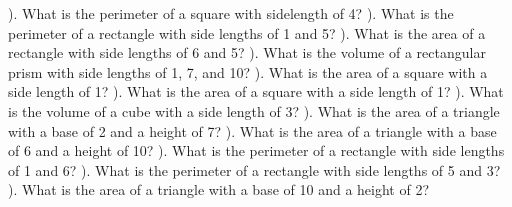 \documentclass{article}%
\begin{document}
\newline%
\newline%
). What is the perimeter of a square with sidelength of 4?%
\newline%
\newline%
). What is the perimeter of a rectangle with side lengths of 1 and 5?%
\newline%
\newline%
). What is the area of a rectangle with side lengths of 6 and 5?%
\newline%
\newline%
). What is the volume of a rectangular prism with side lengths of 1, 7, and 10?%
\newline%
\newline%
). What is the area of a square with a side length of 1?%
\newline%
\newline%
). What is the area of a square with a side length of 1?%
\newline%
\newline%
). What is the volume of a cube with a side length of 3?%
\newline%
\newline%
). What is the area of a triangle with a base of 2 and a height of 7?%
\newline%
\newline%
). What is the area of a triangle with a base of 6 and a height of 10?%
\newline%
\newline%
). What is the perimeter of a rectangle with side lengths of 1 and 6?%
\newline%
\newline%
). What is the perimeter of a rectangle with side lengths of 5 and 3?%
\newline%
\newline%
). What is the area of a triangle with a base of 10 and a height of 2?%
\end{document}
